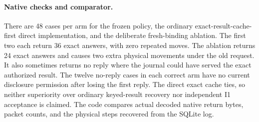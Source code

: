 \documentclass{article}
\begin{document}
\paragraph{Native checks and comparator.}
There are 48 cases per arm for the frozen policy, the ordinary
exact-result-cache-first direct implementation, and the deliberate
fresh-binding ablation. The first two each return 36 exact answers,
with zero repeated moves. The ablation returns 24 exact answers
and causes two extra physical movements under the old request.
It also sometimes returns no reply where the journal could have
served the exact authorized result. The twelve no-reply cases in
each correct arm have no current disclosure permission after losing
the first reply. The direct exact cache ties, so neither superiority
over ordinary keyed-result recovery nor independent I1 acceptance
is claimed. The code compares actual decoded native return bytes,
packet counts, and the physical steps recovered from the SQLite log.
\end{document}
